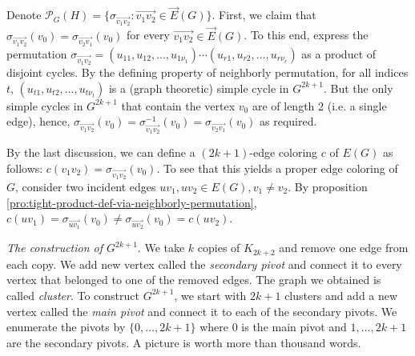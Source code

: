 \documentclass[12pt]{article}
\newtheorem{open question}[theorem]{Open question}
\begin{document}
Denote $\mathscr{P}_G(H)=\{\sigma_{\overrightarrow{v_1v_2}}:\overrightarrow{v_1v_2}\in \vec E(G)\}$.
First, we claim that $\sigma_{\overrightarrow{v_1v_2}}(v_0)=\sigma_{\overrightarrow{v_2v_1}}(v_0)$ for every $\overrightarrow{v_1v_2}\in \vec E(G)$. To this end,
express the permutation $\sigma_{\overrightarrow{v_1v_2}}=(u_{11},u_{12},\ldots,u_{1\nu_1}) \cdots (u_{r1},u_{r2},\ldots,u_{r\nu_r})$ as a product of disjoint cycles. By the defining property of neighborly permutation, 
for all indices $t$, $(u_{t1},u_{t2},\ldots,u_{t\nu_t})$ is a
(graph theoretic) simple cycle in $G^{2k+1}$. But the only simple cycles in $G^{2k+1}$ that contain the vertex $v_0$ are of length 2 (i.e. a single edge), hence, $\sigma_{\overrightarrow{v_1v_2}}(v_0)=\sigma^{-1}_{\overrightarrow{v_1v_2}}(v_0)=\sigma_{\overrightarrow{v_2v_1}}(v_0)$ as required.

By the last discussion, we can define a $(2k+1)$-edge coloring $c$ of $E(G)$ as follows: $c(v_1v_2)=\sigma_{\overrightarrow{v_1v_2}}(v_0)$. To see that this yields a proper edge coloring of $G$, consider two incident edges $uv_1, uv_2 \in E(G),v_1\ne v_2$. By proposition \ref{pro:tight-product-def-via-neighborly-permutation}, $c(uv_1)=\sigma_{\overrightarrow{uv_1}}(v_0)\ne \sigma_{\overrightarrow{uv_2}}(v_0)=c(uv_2)$.

{\em The construction of $G^{2k+1}$}. We take $k$ copies of $K_{2k+2}$ and remove one edge from each copy. We add new vertex called the {\em secondary pivot} and connect it to every vertex that belonged to one of the removed edges. The graph we obtained is called {\em cluster}. To construct $G^{2k+1}$, we start with $2k+1$ clusters and add a new vertex called the {\em main pivot} and connect it to each of the secondary pivots. We enumerate the pivots by $\{0,\ldots ,2k+1\}$ where $0$ is the main pivot and $1,\ldots ,2k+1$ are the secondary pivots. A picture is worth more than thousand words.
\end{document}
